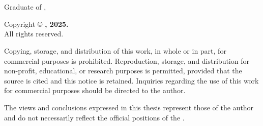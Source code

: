 \thispagestyle{empty}

\vspace*{5cm}

\noindent
\makebox[4cm]{\dotfill} \\
{\bfseries \authorName} \\
Graduate of \schoolName, \\
\universityName

\vspace{5cm}

\noindent
Copyright \copyright{} {\bfseries \authorName, 2025.} \\
All rights reserved.

\noindent
Copying, storage, and distribution of this work, in whole or in part, for commercial purposes is prohibited. Reproduction, storage, and distribution for non-profit, educational, or research purposes is permitted, provided that the source is cited and this notice is retained. Inquiries regarding the use of this work for commercial purposes should be directed to the author.

\noindent
The views and conclusions expressed in this thesis represent those of the author and do not necessarily reflect the official positions of the \universityName.

\cleardoublepage
